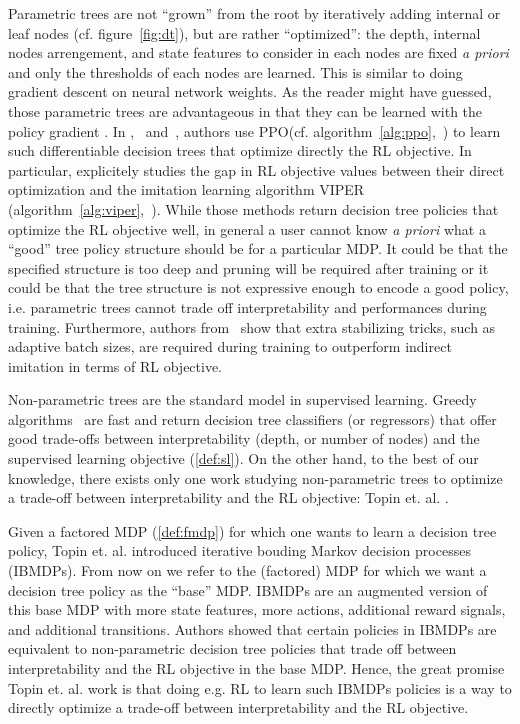 Parametric trees are not ``grown'' from the root by iteratively adding internal or leaf nodes (cf. figure~\ref{fig:dt}), but are rather ``optimized'': the depth, internal nodes arrengement, and state features to consider in each nodes are fixed \textit{a priori} and only the thresholds of each nodes are learned.
This is similar to doing gradient descent on neural network weights.
As the reader might have guessed, those parametric trees are advantageous in that they can be learned with the policy gradient \cite{pg_sutton}.
In \cite{silva},~\cite{vos2024optimizinginterpretabledecisiontree} and~\cite{sympol}, authors use PPO(cf. algorithm~\ref{alg:ppo},~\cite{ppo}) to learn such differentiable decision trees that optimize directly the RL objective.
In particular, \cite{sympol} explicitely studies the gap in RL objective values between their direct optimization and the imitation learning algorithm VIPER (algorithm~\ref{alg:viper},~\cite{viper}).
While those methods return decision tree policies that optimize the RL objective well, in general a user cannot know \textit{a priori}  what a ``good'' tree policy structure should be for a particular MDP.
It could be that the specified structure is too deep and pruning will be required after training or it could be that the tree structure is not expressive enough to encode a good policy, i.e. parametric trees cannot trade off interpretability and performances during training.
Furthermore, authors from~\cite{sympol} show that extra stabilizing tricks, such as adaptive batch sizes, are required during training to outperform indirect imitation in terms of RL objective.

Non-parametric trees are the standard model in supervised learning. Greedy algorithms~\cite{breiman1984classification,ID3,c45} are fast and return decision tree classifiers (or regressors) that offer good trade-offs between interpretability (depth, or number of nodes) and the supervised learning objective (\ref{def:sl}).
On the other hand, to the best of our knowledge, there exists only one work studying non-parametric trees to optimize a trade-off between interpretability and the RL objective: Topin et. al. \cite{topin2021iterative}.

Given a factored MDP (\ref{def:fmdp}) for which one wants to learn a decision tree policy, Topin et. al. introduced iterative bouding Markov decision processes (IBMDPs).
From now on we refer to the (factored) MDP for which we want a decision tree policy as the ``base'' MDP.
IBMDPs are an augmented version of this base MDP with more state features, more actions, additional reward signals, and additional transitions.
Authors showed that certain policies in IBMDPs are equivalent to non-parametric decision tree policies that trade off between interpretability and the RL objective in the base MDP.
Hence, the great promise Topin et. al. work is that doing e.g. RL to learn such IBMDPs policies is a way to directly optimize a trade-off between interpretability and the RL objective.

